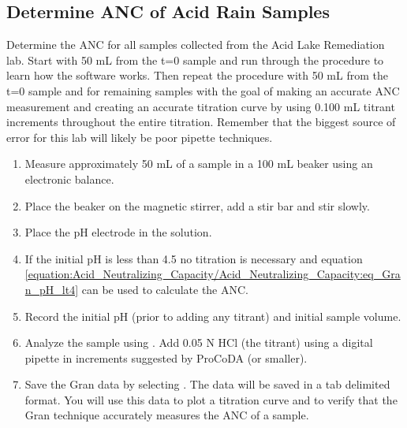 \documentclass[letterpaper,10pt,english]{sphinxmanual}
\begin{document}
\subsection{Determine ANC of Acid Rain Samples}
\label{\detokenize{Acid_Neutralizing_Capacity/Acid_Neutralizing_Capacity:determine-anc-of-acid-rain-samples}}
Determine the ANC for all samples collected from the Acid Lake Remediation lab.  Start with 50 mL from the t=0 sample and run through the procedure to learn how the software works. Then repeat the procedure with 50 mL from the t=0 sample and for remaining samples with the goal of making an accurate ANC measurement and creating an accurate titration curve by using 0.100 mL titrant increments throughout the entire titration. Remember that the biggest source of error for this lab will likely be poor pipette techniques.
\begin{enumerate}
\item {} 
Measure approximately 50 mL of a sample in a 100 mL beaker using an electronic balance.

\item {} 
Place the beaker on the magnetic stirrer, add a stir bar and stir slowly.

\item {} 
Place the pH electrode in the solution.

\item {} 
If the initial pH is less than 4.5 no titration is necessary and equation \eqref{equation:Acid_Neutralizing_Capacity/Acid_Neutralizing_Capacity:eq_Gran_pH_lt4} can be used to calculate the ANC.

\item {} 
Record the initial pH (prior to adding any titrant) and initial sample volume.

\item {} 
Analyze the sample using {\hyperref[\detokenize{ProCoDA/ProCoDA:heading-procoda-gran-plot}]{}}.  Add 0.05 N HCl (the titrant) using a digital pipette in increments suggested by ProCoDA (or smaller).

\item {} 
Save the Gran data by selecting . The data will be saved in a tab delimited format. You will use this data to plot a titration curve and to verify that the Gran technique accurately measures the ANC of a sample.

\end{enumerate}
\end{document}
